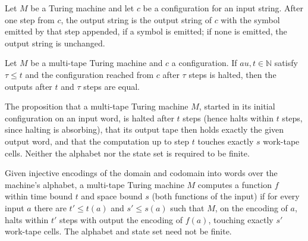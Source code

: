 \begin{lemma}
\label{Turing.MultiTapeTM.step_output}
\leanok
{}
Let $M$ be a Turing machine and let $c$ be a configuration for an input string. After
one step from $c$, the output string is the output string of $c$ with the symbol emitted
by that step appended, if a symbol is emitted; if none is emitted, the output string is
unchanged.
\end{lemma}

\begin{lemma}
\label{Turing.MultiTapeTM.runFrom_output_eq_of_halt}
\leanok
{}
Let $M$ be a multi-tape Turing machine and $c$ a configuration. If $	au,t\in\mathbb{N}$
satisfy $\tau\le t$ and the configuration reached from $c$ after $\tau$ steps is halted,
then the outputs after $t$ and $\tau$ steps are equal.
\end{lemma}

\begin{definition}
\label{Turing.MultiTapeTM.ComputesInTimeAndSpace}
\leanok
{}
The proposition that a multi-tape Turing machine $M$, started in its initial
configuration on an input word, is halted after $t$ steps (hence halts within
$t$ steps, since halting is absorbing), that its output tape then holds
exactly the given output word, and that the computation up to step $t$ touches
exactly $s$ work-tape cells.  Neither the alphabet nor the state set is
required to be finite.
\end{definition}

\begin{definition}
\label{Turing.MultiTapeTM.ComputesFunInTimeAndSpace}
\leanok
{}
Given injective encodings of the domain and codomain into words over the
machine's alphabet, a multi-tape Turing machine $M$ computes a function $f$
within time bound $t$ and space bound $s$ (both functions of the input) if for
every input $a$ there are $t' \le t(a)$ and $s' \le s(a)$ such that $M$, on
the encoding of $a$, halts within $t'$ steps with output the encoding of
$f(a)$, touching exactly $s'$ work-tape cells.  The alphabet and state set
need not be finite.
\end{definition}

